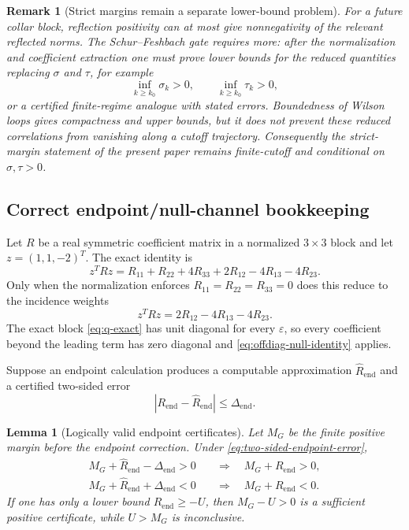 \documentclass[11pt]{article}
\newtheorem{lemma}[theorem]{Lemma}
\newtheorem{remark}[theorem]{Remark}
\newcommand{\eps}{\varepsilon}
\begin{document}
\begin{remark}[Strict margins remain a separate lower-bound problem]
\label{rem:strict-margin-lower-bound}
For a future collar block, reflection positivity can at most give nonnegativity of the relevant reflected norms.  The Schur--Feshbach gate requires more: after the normalization and coefficient extraction one must prove lower bounds for the reduced quantities replacing \(\sigma\) and \(\tau\), for example
\[
  \inf_{k\ge k_0}\sigma_k>0,
  \qquad
  \inf_{k\ge k_0}\tau_k>0,
\]
or a certified finite-regime analogue with stated errors.  Boundedness of Wilson loops gives compactness and upper bounds, but it does not prevent these reduced correlations from vanishing along a cutoff trajectory.  Consequently the strict-margin statement of the present paper remains finite-cutoff and conditional on \(\sigma,\tau>0\).
\end{remark}

\subsection{Correct endpoint/null-channel bookkeeping}

Let $R$ be a real symmetric coefficient matrix in a normalized $3\times3$ block and let $z=(1,1,-2)^T$.  The exact identity is
\begin{equation}
  z^TRz
  =R_{11}+R_{22}+4R_{33}
  +2R_{12}-4R_{13}-4R_{23}.
  \label{eq:full-null-identity}
\end{equation}
Only when the normalization enforces $R_{11}=R_{22}=R_{33}=0$ does this reduce to the incidence weights
\begin{equation}
  z^TRz=2R_{12}-4R_{13}-4R_{23}.
  \label{eq:offdiag-null-identity}
\end{equation}
The exact block \eqref{eq:q-exact} has unit diagonal for every $\eps$, so every coefficient beyond the leading term has zero diagonal and \eqref{eq:offdiag-null-identity} applies.

Suppose an endpoint calculation produces a computable approximation $\widehat R_{\mathrm{end}}$ and a certified two-sided error
\begin{equation}
  |R_{\mathrm{end}}-\widehat R_{\mathrm{end}}|\le\Delta_{\mathrm{end}}.
  \label{eq:two-sided-endpoint-error}
\end{equation}

\begin{lemma}[Logically valid endpoint certificates]
\label{lem:endpoint-certificates}
Let $M_G$ be the finite positive margin before the endpoint correction.  Under \eqref{eq:two-sided-endpoint-error},
\begin{align}
  M_G+\widehat R_{\mathrm{end}}-\Delta_{\mathrm{end}}>0
  &\quad\Longrightarrow\quad
  M_G+R_{\mathrm{end}}>0,
  \label{eq:endpoint-positive-certificate}\\
  M_G+\widehat R_{\mathrm{end}}+\Delta_{\mathrm{end}}<0
  &\quad\Longrightarrow\quad
  M_G+R_{\mathrm{end}}<0.
  \label{eq:endpoint-negative-certificate}
\end{align}
If one has only a lower bound $R_{\mathrm{end}}\ge-U$, then $M_G-U>0$ is a sufficient positive certificate, while $U>M_G$ is inconclusive.
\end{lemma}
\end{document}
